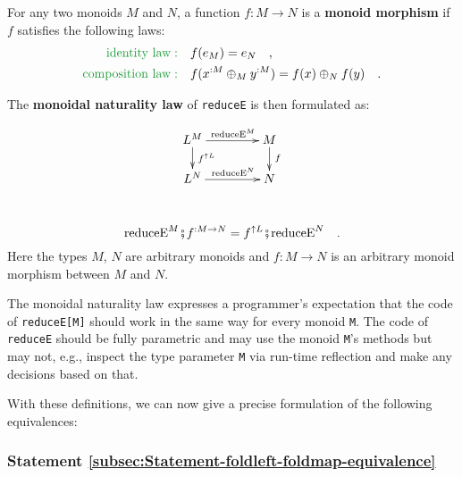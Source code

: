 For any two monoids $M$ and $N$, a function $f:M\rightarrow N$
is a \textbf{monoid morphism} if $f$
satisfies the following laws:
\begin{align*}
{\color{greenunder}\text{identity law}:}\quad & f(e_{M})=e_{N}\quad,\\
{\color{greenunder}\text{composition law}:}\quad & f(x^{:M}\oplus_{M}y^{:M})=f(x)\oplus_{N}f(y)\quad.
\end{align*}

The \textbf{monoidal naturality law} of
\lstinline!reduceE! is then formulated as:

\begin{wrapfigure}{l}{0.2\columnwidth}%
\vspace{-2.15\baselineskip}
\[
\xymatrix{\xyScaleY{1.4pc}\xyScaleX{3.5pc}L^{M}\ar[r]\sp(0.5){\ \text{reduceE}^{M}}\ar[d]\sp(0.45){\,f^{\uparrow L}} & M\ar[d]\sp(0.45){\,f}\\
L^{N}\ar[r]\sp(0.5){~\text{reduceE}^{N}} & N
}
\]
\vspace{-0.6\baselineskip}
\end{wrapfigure}%

~\vspace{-0.4\baselineskip}
\begin{equation}
\text{reduceE}^{M}\bef f^{:M\rightarrow N}=f^{\uparrow L}\bef\text{reduceE}^{N}\quad.\label{eq:monoidal-naturality-law-of-reduceE}
\end{equation}
Here the types $M$, $N$ are arbitrary monoids and $f:M\rightarrow N$
is an arbitrary monoid morphism between $M$ and $N$. 

The monoidal naturality law expresses a programmer\textsf{'}s expectation that
the code of \lstinline!reduceE[M]! should work in the same way for
every monoid \lstinline!M!. The code of \lstinline!reduceE! should
be fully parametric and may use the monoid \lstinline!M!\textsf{'}s methods
but may not, e.g., inspect the type parameter \lstinline!M! via run-time
reflection and make any decisions based on that. 

With these definitions, we can now give a precise formulation of the
following equivalences:

\subsubsection{Statement \label{subsec:Statement-foldleft-foldmap-equivalence}\ref{subsec:Statement-foldleft-foldmap-equivalence}}

